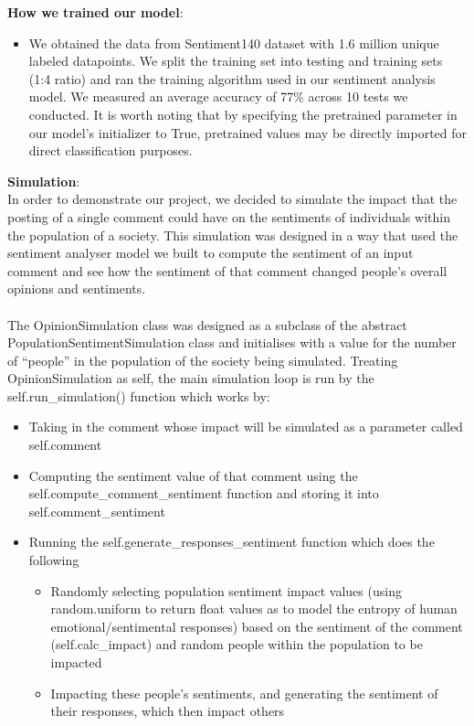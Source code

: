 \documentclass[fontsize=11pt]{article}
\begin{document}
\textbf{How we trained our model}:
\begin{itemize}
    \item We obtained the data from Sentiment140 dataset with 1.6 million unique labeled datapoints. We split the training set into testing and training sets (1:4 ratio) and ran the training algorithm used in our sentiment analysis model. We measured an average accuracy of 77\% across 10 tests we conducted. It is worth noting that by specifying the pretrained parameter in our model's initializer to True, pretrained values may be directly imported for direct classification purposes.
\end{itemize}
\textbf{Simulation}:\\
In order to demonstrate our project, we decided to simulate the impact that the posting of a single comment could have on the sentiments of individuals within the population of a society. This simulation was designed in a way that used the sentiment analyser model we built to compute the sentiment of an input comment and see how the sentiment of that comment changed people’s overall opinions and sentiments. \\\\
The OpinionSimulation class was designed as a subclass of the abstract PopulationSentimentSimulation class and initialises with a value for the number of “people” in the population of the society being simulated. Treating OpinionSimulation as self, the main simulation loop is run by the self.run\_simulation() function which works by:
\begin{itemize}
    \item Taking in the comment whose impact will be simulated as a parameter called self.comment
    \item Computing the sentiment value of that comment using the self.compute\_comment\_sentiment function and storing it into self.comment\_sentiment
    \item Running the self.generate\_responses\_sentiment function which does the following
    \begin{itemize}
        \item Randomly selecting population sentiment impact values (using random.uniform to return float values as to model the entropy of human emotional/sentimental responses) based on the sentiment of the comment (self.calc\_impact) and random people within the population to be impacted
        \item Impacting these people’s sentiments, and generating the sentiment of their responses, which then impact others
    \end{itemize}
\end{itemize}
\end{document}
